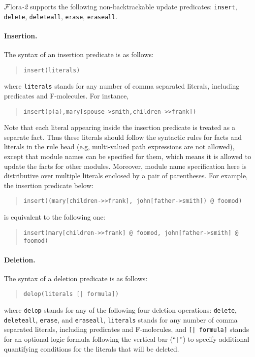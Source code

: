 \documentclass[11pt]{article}
\newcommand{\FLORA}{{\mbox{${\cal F}${\sc lora}\rm\emph{-2}}}\xspace}
\begin{document}
\FLORA supports the following non-backtrackable update predicates:
{\tt insert}, {\tt delete}, {\tt deleteall}, {\tt erase}, {\tt eraseall}.

%
\paragraph{Insertion.} The syntax of an insertion predicate is as follows:
\begin{quote}
\verb|insert(literals)|
\end{quote}
where {\tt literals} stands for any number of comma separated literals,
including predicates and \mbox{F-molecules}. For instance,
\begin{quote}
\verb|insert(p(a),mary[spouse->smith,children->>frank])|
\end{quote}

Note that each literal appearing inside the insertion predicate is
treated as a separate fact. Thus these literals should follow the
syntactic rules for facts and literals in the rule head (e.g,
multi-valued path expressions are not allowed), except that module
names can be specified for them, which means it is allowed to update
the facts for other modules. Moreover, module name specification here
is distributive over multiple literals enclosed by a pair of
parentheses. For example, the insertion predicate below:
\begin{quote}
\verb|insert((mary[children->>frank], john[father->smith]) @ foomod)|
\end{quote}
is equivalent to the following one:
\begin{quote}
\verb|insert(mary[children->>frank] @ foomod, john[father->smith] @ foomod)|
\end{quote}


%
\paragraph{Deletion.} The syntax of a deletion predicate is as follows:
\begin{quote}
\begin{verbatim}
delop(literals [| formula])
\end{verbatim}
\end{quote}
where {\tt delop} stands for any of the following four deletion
operations: {\tt delete}, {\tt deleteall}, {\tt erase}, and
{\tt eraseall}, {\tt literals} stands for any number of comma
separated literals, including predicates and \mbox{F-molecules},
and {\tt [| formula]} stands for an optional logic formula following
the vertical bar (``{\tt |}'') to specify additional quantifying
conditions for the literals that will be deleted.
\end{document}
